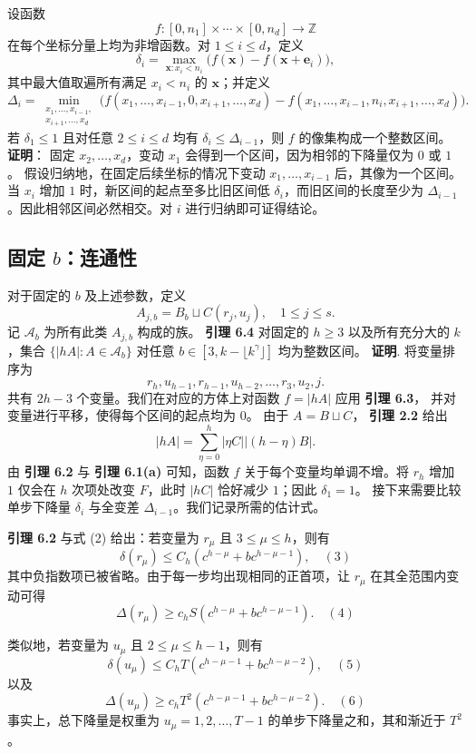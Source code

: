 \documentclass[11pt]{article}
\theoremstyle{break}
\begin{document}
设函数
\[
f: [0, n_1] \times \cdots \times [0, n_d] \to \mathbb{Z}
\]
在每个坐标分量上均为非增函数。对 $1 \le i \le d$，定义
\[
\delta_i = \max_{\mathbf{x} : x_i < n_i} \big( f(\mathbf{x}) - f(\mathbf{x} + \mathbf{e}_i) \big),
\]
其中最大值取遍所有满足 $x_i < n_i$ 的 $
\mathbf{x}$；并定义
\[
\Delta_i = \min_{\substack{x_1, \dots, x_{i-1}, \\ x_{i+1}, \dots, x_d}} \big( f(x_1, \dots, x_{i-1}, 0, x_{i+1}, \dots, x_d) - f(x_1, \dots, x_{i-1}, n_i, x_{i+1}, \dots, x_d) \big).
\]
若 $\delta_1 \le 1$ 且对任意 $2 \le i \le d$ 均有 $\delta_i \le \Delta_{i-1}$，则 $f$ 的像集构成一个整数区间。
\textbf{证明}：
固定 $x_2, \dots, x_d$，变动 $x_1$ 会得到一个区间，因为相邻的下降量仅为 $0$ 或 $1$。
假设归纳地，在固定后续坐标的情况下变动 $x_1, \dots, x_{i-1}$ 后，其像为一个区间。当 $x_i$ 增加 $1$ 时，新区间的起点至多比旧区间低 $\delta_i$，而旧区间的长度至少为 $\Delta_{i-1}$。因此相邻区间必然相交。对 $i$ 进行归纳即可证得结论。
\subsection{固定 $b$：连通性}
对于固定的 $b$ 及上述参数，定义
\[
A_{j,b} = B_b \sqcup C(r_j, u_j), \quad 1 \le j \le s.
\]
记 $\mathcal{A}_b$ 为所有此类 $A_{j,b}$ 构成的族。
\textbf{引理 6.4}
对固定的 $h \geq 3$ 以及所有充分大的 $k$，集合 $\{ |hA| : A \in \mathcal{A}_b \}$ 对任意 $b \in [3, k - \lfloor k^\gamma \rfloor]$ 均为整数区间。
\textbf{证明}.
将变量排序为
\[ r_h, u_{h-1}, r_{h-1}, u_{h-2}, \dots, r_3, u_2, j. \]
共有 $2h-3$ 个变量。我们在对应的方体上对函数 $f = |hA|$ 应用
\textbf{引理 6.3}，
并对变量进行平移，使得每个区间的起点均为 $0$。
由于 $A = B \sqcup C$，
\textbf{引理 2.2} 给出
\[ |hA| = \sum_{\eta=0}^h |\eta C| |(h-\eta)B|. \tag{2} \]
由
\textbf{引理 6.2}
与
\textbf{引理 6.1(a)}
可知，函数 $f$ 关于每个变量均单调不增。将 $r_h$ 增加 $1$ 仅会在 $h$ 次项处改变 $F$，此时 $|hC|$ 恰好减少 $1$；因此 $\delta_1 = 1$。
接下来需要比较单步下降量 $\delta_i$ 与全变差 $\Delta_{i-1}$。我们记录所需的估计式。

\textbf{引理 6.2}
与式 (2) 给出：若变量为 $r_\mu$ 且 $3 \le \mu \le h$，则有
\[ \delta(r_\mu) \le C_h \left( c^{h-\mu} + b c^{h-\mu-1} \right), \quad (3) \]
其中负指数项已被省略。由于每一步均出现相同的正首项，让 $r_\mu$ 在其全范围内变动可得
\[ \Delta(r_\mu) \ge c_h S \left( c^{h-\mu} + b c^{h-\mu-1} \right). \quad (4) \]

类似地，若变量为 $u_\mu$ 且 $2 \le \mu \le h-1$，则有
\[ \delta(u_\mu) \le C_h T \left( c^{h-\mu-1} + b c^{h-\mu-2} \right), \quad (5) \]
以及
\[ \Delta(u_\mu) \ge c_h T^2 \left( c^{h-\mu-1} + b c^{h-\mu-2} \right). \quad (6) \]
事实上，总下降量是权重为 $u_\mu = 1,2,\dots,T-1$ 的单步下降量之和，其和渐近于 $T^2$。
\end{document}
